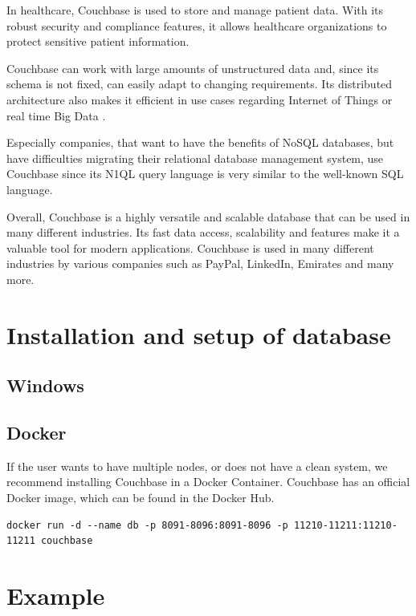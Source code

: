 In healthcare, Couchbase is used to store and manage patient data. With its robust security and compliance features, it allows healthcare organizations to protect sensitive patient information.
 
Couchbase can work with large amounts of unstructured data and, since its schema is not fixed, can easily adapt to changing requirements. Its distributed architecture also makes it efficient in use cases regarding Internet of Things or real time Big Data \parencite{StudentCouchbase.}.

Especially companies, that want to have the benefits of NoSQL databases, but have difficulties migrating their relational database management system, use Couchbase since its \ac{N1QL} query language is very similar to the well-known \ac{SQL} language.

Overall, Couchbase is a highly versatile and scalable database that can be used in many different industries. Its fast data access, scalability and features make it a valuable tool for modern applications. Couchbase is used in many different industries by various companies such as PayPal, LinkedIn, Emirates and many more.

\section{Installation and setup of database}

\subsection{Windows}


\subsection{Docker}
If the user wants to have multiple nodes, or does not have a clean system, we recommend installing Couchbase in a Docker Container. Couchbase has an official Docker image, which can be found in the Docker Hub.

\begin{lstlisting}
docker run -d --name db -p 8091-8096:8091-8096 -p 11210-11211:11210-11211 couchbase
\end{lstlisting}


\section{Example}

